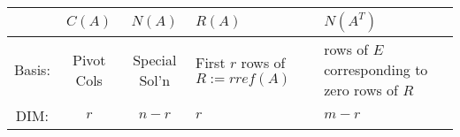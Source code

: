 \documentclass[a4paper,12pt]{article}
\begin{document}
\begin{tabularx}{\linewidth}[t]{|c|c|c|X|X|}
		\hline
		& $C(A)$ & $N(A)$ & $R(A)$ & $N(A^T)$ \\
		\hline
		Basis: & Pivot Cols & Special Sol'n & First $r$ rows of $R:=rref(A)$ & rows of $E$ corresponding to zero rows of $R$\\
		\hline
		DIM: & $r$ & $n-r$ & $r$ & $m-r$ \\
		\hline
		\end{tabularx}		
\end{document}
